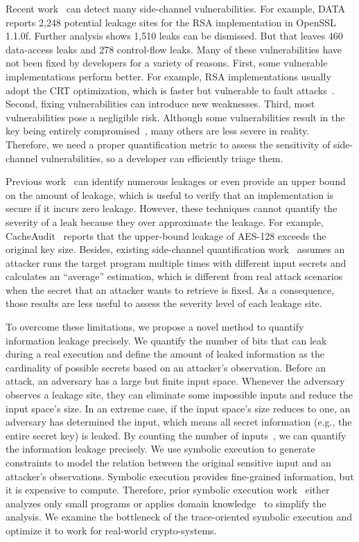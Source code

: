 Recent work~\cite{203878,217537,Wichelmann:2018:MFF:3274694.3274741,Brotzman19Casym,236338,182946}
can detect many side-channel vulnerabilities. For example,
DATA~\cite{217537} reports 2,248 potential leakage sites for the RSA
implementation in OpenSSL 1.1.0f\@. 
Further analysis shows 1,510 leaks can be dismissed. But that
leaves 460 data-access leaks and 278 control-flow leaks. 
Many of these vulnerabilities have not been fixed by developers for a variety of reasons.
First, some vulnerable implementations perform better. For example,
RSA implementations usually adopt the CRT optimization,
which is faster but vulnerable to fault attacks~\cite{aumuller2002fault}.
Second, fixing vulnerabilities can introduce new 
weaknesses.
Third, most vulnerabilities pose a negligible risk. 
Although some vulnerabilities result in the key being 
entirely compromised~\cite{184415, aumuller2002fault}, 
many others are less
severe in reality. Therefore, we need a proper quantification metric to 
assess the sensitivity of side-channel vulnerabilities,
so a developer can efficiently triage them.

Previous work~\cite{182946,5207642} can identify numerous leakages or even provide an upper bound on the amount of leakage, which is useful to verify that an implementation is secure if it incurs zero leakage.
However, these techniques cannot quantify the severity of a leak because they over approximate the leakage. For example, CacheAudit~\cite{182946} 
reports that the upper-bound leakage of AES-128 exceeds the original key size. Besides, existing side-channel quantification work~\cite{182946,5207642} assumes an attacker runs the target program multiple times with different
input secrets and calculates an ``average'' estimation, which is different from real attack scenarios when the secret that an attacker wants to retrieve is fixed. As a consequence, those results are less useful to assess the severity level of each leakage site.

To overcome these limitations, we propose a novel method to quantify information 
leakage precisely. We quantify the number of bits that can leak during a real 
execution and define the amount of leaked information as the cardinality of 
possible secrets based on an attacker's observation. Before an attack, an adversary has a large but finite input space. 
Whenever the adversary observes a leakage site, they can eliminate some impossible 
inputs and reduce the input space's size. In an extreme case, if the input space's size reduces to one, an adversary has determined the input, which means all secret information (e.g., the entire secret key) is
leaked. By counting the number of inputs~\cite{10.1007/11499107_24}, we can quantify the information leakage precisely.
We use symbolic execution to generate constraints to model the relation 
between the original sensitive input and an attacker's observations. 
Symbolic execution provides fine-grained information, but it is expensive
to compute. Therefore, prior symbolic
execution work~\cite{203878,236338,Brotzman19Casym} either analyzes only
small programs or applies domain knowledge~\cite{203878} to simplify the analysis. We
examine the bottleneck of the trace-oriented symbolic execution and optimize it
to work for real-world crypto-systems.

